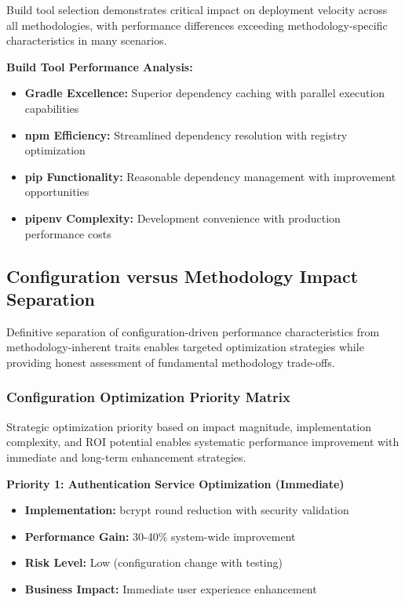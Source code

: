 Build tool selection demonstrates critical impact on deployment velocity across all methodologies, with performance differences exceeding methodology-specific characteristics in many scenarios.

\textbf{Build Tool Performance Analysis:}
\begin{itemize}
\item \textbf{Gradle Excellence:} Superior dependency caching with parallel execution capabilities
\item \textbf{npm Efficiency:} Streamlined dependency resolution with registry optimization
\item \textbf{pip Functionality:} Reasonable dependency management with improvement opportunities
\item \textbf{pipenv Complexity:} Development convenience with production performance costs
\end{itemize}

\subsection{Configuration versus Methodology Impact Separation}
\label{subsec:configuration_methodology}

Definitive separation of configuration-driven performance characteristics from methodology-inherent traits enables targeted optimization strategies while providing honest assessment of fundamental methodology trade-offs.

\subsubsection{Configuration Optimization Priority Matrix}

Strategic optimization priority based on impact magnitude, implementation complexity, and ROI potential enables systematic performance improvement with immediate and long-term enhancement strategies.



\textbf{Priority 1: Authentication Service Optimization (Immediate)}
\begin{itemize}
\item \textbf{Implementation:} bcrypt round reduction with security validation
\item \textbf{Performance Gain:} 30-40\% system-wide improvement
\item \textbf{Risk Level:} Low (configuration change with testing)
\item \textbf{Business Impact:} Immediate user experience enhancement
\end{itemize}

